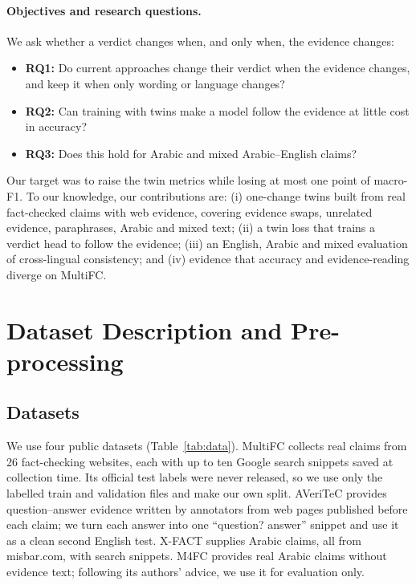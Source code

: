 \paragraph{Objectives and research questions.}
We ask whether a verdict changes when, and only when, the evidence changes:
\begin{itemize}\setlength{\itemsep}{1pt}
  \item \textbf{RQ1:} Do current approaches change their verdict when the evidence changes, and keep it when only wording or language changes?
  \item \textbf{RQ2:} Can training with twins make a model follow the evidence at little cost in accuracy?
  \item \textbf{RQ3:} Does this hold for Arabic and mixed Arabic--English claims?
\end{itemize}
Our target was to raise the twin metrics while losing at most one point of macro-F1. To our knowledge, our contributions are: (i) one-change twins built from real fact-checked claims with web evidence, covering evidence swaps, unrelated evidence, paraphrases, Arabic and mixed text; (ii) a twin loss that trains a verdict head to follow the evidence; (iii) an English, Arabic and mixed evaluation of cross-lingual consistency; and (iv) evidence that accuracy and evidence-reading diverge on MultiFC.

\section{Dataset Description and Pre-processing}

\subsection{Datasets}
We use four public datasets (Table~\ref{tab:data}). MultiFC \citep{augenstein2019multifc} collects real claims from 26 fact-checking websites, each with up to ten Google search snippets saved at collection time. Its official test labels were never released, so we use only the labelled train and validation files and make our own split. AVeriTeC \citep{schlichtkrull2023averitec} provides question--answer evidence written by annotators from web pages published before each claim; we turn each answer into one ``question? answer'' snippet and use it as a clean second English test. X-FACT \citep{gupta2021xfact} supplies Arabic claims, all from misbar.com, with search snippets. M4FC \citep{geng2025m4fc} provides real Arabic claims without evidence text; following its authors' advice, we use it for evaluation only.

